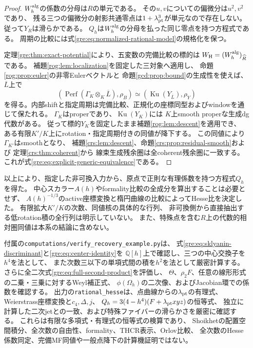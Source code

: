\begin{proof}
$W_h^{\rm alg}$の係数の分母は$R$の単元である。
その$u,v$についての偏微分は$u^2,v^2$であり、
残る三つの偏微分の射影共通零点は$1+\lambda_{\rm pt}^3$が単元なので存在しない。
従って$Y_R$は滑らかである。
$Q_h$は$W_h^{\rm alg}$の分母を払った同じ零点を持つ方程式である。
周期の比較には式\eqref{gre:eq:normalized-rational-model}の規格化を保つ。

定理\ref{gre:thm:exact-potential}により、五変数の完備比較の標的は
$W_{\rm H}=(W_h^{\rm alg})_{\widehat R}$である。
補題\ref{rog:lem:localization}を固定した三対象へ適用し、
命題\ref{rog:prop:euler}の非零Eulerベクトルと
命題\ref{gcd:prop:bound}の生成性を使えば、$\overline L$上で
\[
 (\operatorname{Perf}(\Gamma_K\otimes_K\overline L),\rho_B)
 \simeq(\operatorname{Ku}(Y_{\overline L}),\rho_Y)
\]
を得る。内部shiftと指定周期は完備比較、正規化の座標同型およびwindowを通じて保たれる。
$\Gamma_K$はproperであり、$\operatorname{Ku}(Y_K)$には
$K$上smooth properな生成dg代数がある。
従って標的$Y_K$を固定したまま補題\ref{rog:lem:descent}を適用でき、
ある有限$K'/K$上にrotation・指定周期付きの同値が降下する。
この同値により$\Gamma_{K'}$はsmoothとなり、
補題\ref{crs:lem:descent}、命題\ref{crs:prop:residual-smooth}および
定理\ref{crs:thm:coherent}から
線束生成残余圏は全coherent残余圏に一致する。
これが式\eqref{gre:eq:explicit-generic-equivalence}である。
\end{proof}

以上により、指定した非可換入力から、原点で正則な有理係数を持つ方程式$Q_h$を得た。
中心スカラー$A(h)$やformality比較の全成分を算出することは必要とせず、
$A(h)^{-1/3}$のactive座標変換と楕円曲線の比較によってHesse比を決定した。
有限拡大$K'/K$の次数、同値核の具体的な行列、
非可換側から直接抽出する低rotation積の全行列は明示していない。
また、特殊点を含む$R$上の代数的相対圏同値は本系の結論に含めない。

付属の\texttt{computations/verify\_recovery\_example.py}は、
式\eqref{gre:eq:sklyanin-discriminant}と\eqref{gre:eq:center-identity}を
$\mathbb Q[h]$上で確認し、三つの中心交換子を$h^4$を法として、
また次数三以下の単項式間の積を$h^2$を法として厳密計算する。
さらに全二次式\eqref{gre:eq:full-second-product}を評価し、
$\Theta$、$\rho_2F$、任意の線形形式の二乗・三乗に対するWeyl補正式、
$\phi(\Omega_h)$の二次像、およびJacobian環での係数を確認する。
出力の\texttt{rational\_hesse}は、点曲線からの$\lambda_{\rm pt}$の有理式、
Weierstrass座標変換と$c_4,\Delta,j$、
$Q_h=3(4-h^4)(F+\lambda_{\rm pt}xyz)$の恒等式、
独立に計算した二次jetとの一致、および特殊ファイバーの滑らかさを厳密に確認する。
これらは有限な多項式・有理式の恒等式の検算であり、
Shoikhetの配置空間積分、全次数の自由性、formality、THCR表示、Orlov比較、
全次数のHesse係数同定、完備MF同値や一般点降下の計算機証明ではない。
